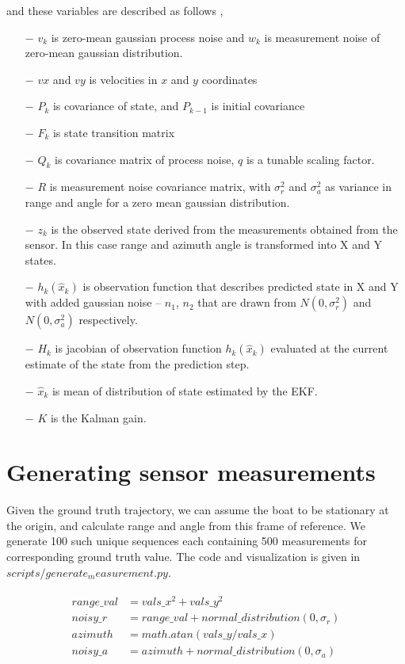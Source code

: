 \documentclass[12pt]{article}
\begin{document}
and these variables are described as follows ,
\begin{itemize}
    \item[$-$] $v_{k}$ is zero-mean gaussian process noise and $w_{k}$ is measurement noise of zero-mean gaussian distribution. 
    \item[$-$] $vx$ and $vy$ is velocities in $x$ and $y$ coordinates
    \item[$-$] $P_{k}$ is covariance of state, and $P_{k-1}$ is initial covariance
    \item[$-$] $F_{k}$ is state transition matrix
    \item[$-$] $Q_{k}$ is covariance matrix of process noise, $q$ is a tunable scaling factor.
	\item[$-$] $R$ is measurement noise covariance matrix, with $\sigma_{r}^{2}$ and $\sigma_{a}^{2}$ as variance in range and angle for a zero mean gaussian distribution.
    \item[$-$] $z_{k}$ is the observed state derived from the measurements obtained from the sensor. In this case range and azimuth angle is transformed into X and Y states.
 
    \item[$-$] $h_{k}(\hat{x}_{k})$ is observation function that describes predicted state in X and Y with added gaussian noise -- $n_{1}$, $n_{2}$ that are drawn from $N(0, \sigma_{r}^{2})$ and $N(0, \sigma_{a}^{2})$ respectively. 
    \item[$-$] $H_{k}$ is jacobian of observation function $h_{k}(\hat{x}_{k})$ evaluated at the current estimate of the state from the prediction step.
    \item[$-$] $\hat{x}_{k}$ is mean  of distribution of state estimated by the EKF.
    \item[$-$] $K$ is the Kalman gain.


\end{itemize}
\section{Generating sensor measurements}

Given the ground truth trajectory, we can assume the boat to be stationary at the origin, and calculate range and angle from this frame of reference.  We generate 100 such unique sequences each containing 500 measurements for corresponding ground truth value. The code and visualization is given in $scripts/generate_measurement.py$.

\begin{eqnarray}
\left.\begin{aligned}
range\_val & = vals\_x^{2} + vals\_y^{2}\\
noisy\_r & = range\_val + normal\_distribution(0, \sigma_{r})\\
azimuth & = math.atan(vals\_y/vals\_x)\\
noisy\_a & = azimuth + normal\_distribution(0, \sigma_{a})\\
\end{aligned}\right.
\end{eqnarray}
\end{document}
